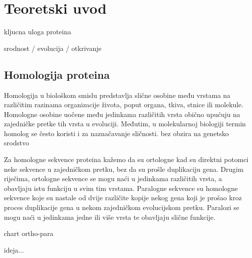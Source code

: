 \chapter{Teoretski uvod}
\label{chap:teoretski-uvod}

kljucna uloga proteina

srodnost / evolucija / otkrivanje

\section{Homologija proteina}

Homologija u biološkom smislu predstavlja slične osobine među vrstama na različitim razinama organizacije života, poput organa, tkiva, stnice ili molekule.
Homologne osobine uočene među jedinkama različitih vrsta obično upućuju na zajedničke pretke tih vrsta u evoluciji. Međutim, u molekularnoj biologiji termin homolog se često koristi i za naznačavanje sličnosti. bez obzira na genetsko srodstvo \cite{bioinfo1}

Za homologne sekvence proteina kažemo da su ortologne kad su direktni potomci neke sekvence u zajedničkom pretku, bez da su prošle duplikaciju gena. Drugim riječima, ortologne sekvence se mogu naći u jedinkama različitih vrsta, a obavljaju istu funkciju u svim tim vrstama. Paralogne sekvence su homologne sekvence koje su nastale od dvije različite kopije nekog gena koji je prošao kroz proces duplikacije gena u nekom zajedničkom evolucijskom pretku. Paralozi se mogu naći u jedinkama jedne ili više vrsta te obavljaju slične funkcije.

chart ortho-para


ideja...


